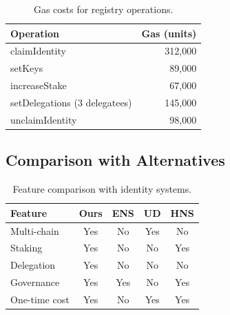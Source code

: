 \begin{table}[h]
\centering
\caption{Gas costs for registry operations.}
\label{tab:gas}
\begin{tabular}{lr}
\toprule
\textbf{Operation} & \textbf{Gas (units)} \\
\midrule
claimIdentity & 312,000 \\
setKeys & 89,000 \\
increaseStake & 67,000 \\
setDelegations (3 delegatees) & 145,000 \\
unclaimIdentity & 98,000 \\
\bottomrule
\end{tabular}
\end{table}

\subsection{Comparison with Alternatives}

\begin{table}[h]
\centering
\caption{Feature comparison with identity systems.}
\label{tab:compare}
\begin{tabular}{lcccc}
\toprule
\textbf{Feature} & \textbf{Ours} & \textbf{ENS} & \textbf{UD} & \textbf{HNS} \\
\midrule
Multi-chain & Yes & No & Yes & No \\
Staking & Yes & No & No & Yes \\
Delegation & Yes & No & No & No \\
Governance & Yes & Yes & No & Yes \\
One-time cost & Yes & No & Yes & Yes \\
\bottomrule
\end{tabular}
\end{table}

